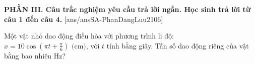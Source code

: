 
\noindent \textbf{PHẦN III. Câu trắc nghiệm yêu cầu trả lời ngắn. Học sinh trả lời từ câu 1 đến câu 4.}
[ans/ansSA-PhanDangLuu2106]

\begin{ex}	Một vật nhỏ dao động điều hòa với phương trình li độ: $x = 10 \cos\left(\pi t + \frac{\pi}{6}\right)\text{ (cm)}$, với $t$ tính bằng giây. Tần số dao động riêng của vật bằng bao nhiêu Hz?

	\par{}
\end{ex}

